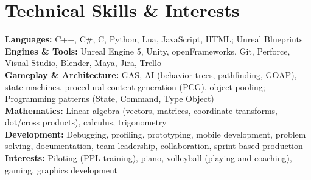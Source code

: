 \documentclass[10pt,letterpaper]{extarticle}
\begin{document}
\section*{Technical Skills \& Interests}
{\RaggedRight
\textbf{Languages:} C++, C\#, C, Python, Lua, JavaScript, HTML; Unreal Blueprints\\
\textbf{Engines \& Tools:} Unreal Engine 5, Unity, openFrameworks, Git, Perforce, Visual Studio, Blender, Maya, Jira, Trello\\
\textbf{Gameplay \& Architecture:} GAS, AI (behavior trees, pathfinding, GOAP), state machines, procedural content generation (PCG), object pooling; Programming patterns (State, Command, Type Object)\\
\textbf{Mathematics:} Linear algebra (vectors, matrices, coordinate transforms, dot/cross products), calculus, trigonometry\\
\textbf{Development:} Debugging, profiling, prototyping, mobile development, problem solving, \href{https://nrhart.github.io/NoahsPortfolio/technical-writeups.html}{documentation}, team leadership, collaboration, sprint-based production\\
\textbf{Interests:} Piloting (PPL training), piano, volleyball (playing and coaching), gaming, graphics development
}
\end{document}
